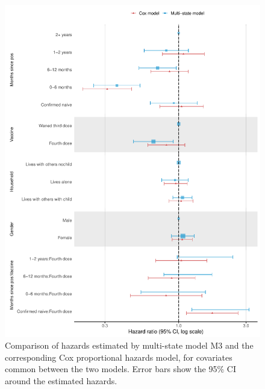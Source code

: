 \begin{figure}[htbp!]
    \centering
    \includegraphics[width=\textwidth]{04_SIREN/Figs/vaccine_short_noev.pdf}
    \caption[Comparison of hazards estimated by multi-state model and the corresponding Cox proportional hazards model]{Comparison of hazards estimated by multi-state model M3 and the corresponding Cox proportional hazards model, for covariates common between the two models. Error bars show the 95\% CI around the estimated hazards.}\label{fig:vaccine_short_noev}
\end{figure}

